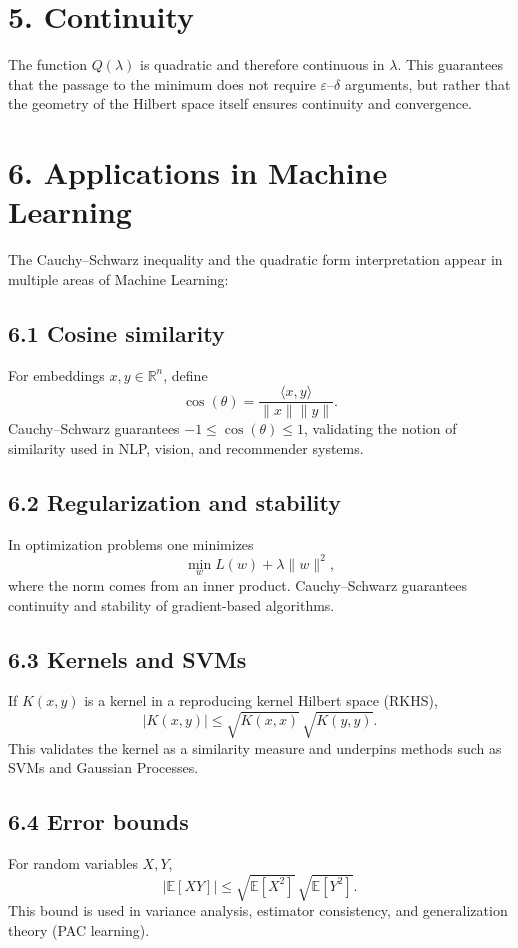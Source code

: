\documentclass[12pt]{article}
\begin{document}
\section*{5. Continuity}
The function $Q(\lambda)$ is quadratic and therefore continuous in $\lambda$. 
This guarantees that the passage to the minimum does not require $\varepsilon$--$\delta$ arguments, 
but rather that the geometry of the Hilbert space itself ensures continuity and convergence.

\section*{6. Applications in Machine Learning}

The Cauchy--Schwarz inequality and the quadratic form interpretation 
appear in multiple areas of Machine Learning:

\subsection*{6.1 Cosine similarity}
For embeddings $x,y \in \mathbb{R}^n$, define
\[
\cos(\theta) = \frac{\langle x,y\rangle}{\|x\|\|y\|}.
\]
Cauchy--Schwarz guarantees $-1 \leq \cos(\theta) \leq 1$, 
validating the notion of similarity used in NLP, vision, and recommender systems.

\subsection*{6.2 Regularization and stability}
In optimization problems one minimizes
\[
\min_w L(w) + \lambda \|w\|^2,
\]
where the norm comes from an inner product. 
Cauchy--Schwarz guarantees continuity and stability of gradient-based algorithms.

\subsection*{6.3 Kernels and SVMs}
If $K(x,y)$ is a kernel in a reproducing kernel Hilbert space (RKHS),
\[
|K(x,y)| \leq \sqrt{K(x,x)} \, \sqrt{K(y,y)}.
\]
This validates the kernel as a similarity measure and underpins methods such as SVMs and Gaussian Processes.

\subsection*{6.4 Error bounds}
For random variables $X,Y$,
\[
|\mathbb{E}[XY]| \leq \sqrt{\mathbb{E}[X^2]} \, \sqrt{\mathbb{E}[Y^2]}.
\]
This bound is used in variance analysis, estimator consistency, 
and generalization theory (PAC learning).
\end{document}
